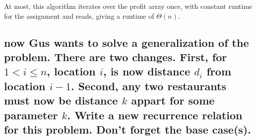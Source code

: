 \documentclass[titlepage]{article}\usepackage[]{graphicx}\usepackage[]{color}
\begin{document}
At most, this algorithm iterates over the profit array once, with constant
runtime for the assignment and reads, giving a runtime of $\Theta(n)$.

\subsection{now Gus wants to solve a generalization of the problem. There are
  two changes. First, for $1 < i \leq n$, location $i$, is now distance $d_i$
  from location $i-1$. Second, any two restaurants must now be distance $k$
  appart for some parameter $k$. Write a new recurrence relation for this
problem. Don't forget the base case(s).}
\end{document}
